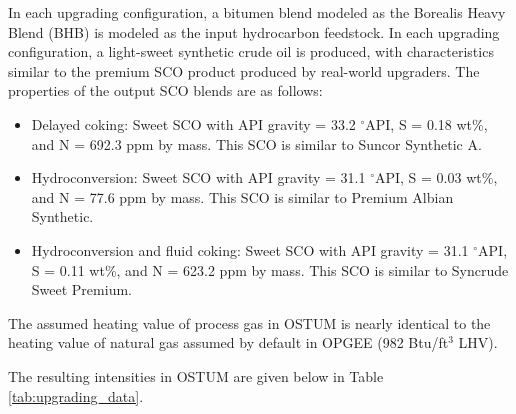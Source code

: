 \documentclass[11pt]{report}
\begin{document}
In each upgrading configuration, a bitumen blend modeled as the Borealis Heavy Blend (BHB) is modeled as the input hydrocarbon feedstock.  In each upgrading configuration, a light-sweet synthetic crude oil is produced, with characteristics similar to the premium SCO product produced by real-world upgraders.  The properties of the output SCO blends are as follows:
\begin{itemize}
\item Delayed coking: Sweet SCO with API gravity = 33.2 $^\circ$API, S = 0.18 wt\%, and N = 692.3 ppm by mass. This SCO is similar to Suncor Synthetic A.
\item Hydroconversion: Sweet SCO with API gravity = 31.1 $^\circ$API, S = 0.03 wt\%, and N = 77.6 ppm by mass. This SCO is similar to Premium Albian Synthetic.
\item Hydroconversion and fluid coking: Sweet SCO with API gravity = 31.1 $^\circ$API, S = 0.11 wt\%, and N = 623.2 ppm by mass. This SCO is similar to Syncrude Sweet Premium.
\end{itemize}

The assumed heating value of process gas in OSTUM is nearly identical to the heating value of natural gas assumed by default in OPGEE (982 Btu/ft$^3$ LHV).  

The resulting intensities in OSTUM are given below in Table \ref{tab:upgrading_data}.
\end{document}
